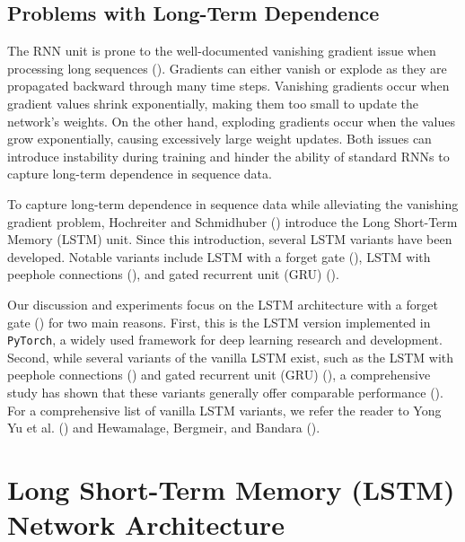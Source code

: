 \documentclass[
  letterpaper,
  double,
  12pt,
  1.0in]{beavtex}
\begin{document}
\subsection{Problems with Long-Term
Dependence}\label{problems-with-long-term-dependence}

The RNN unit is prone to the well-documented vanishing gradient issue
when processing long sequences
().
Gradients can either vanish or explode as they are propagated backward
through many time steps. Vanishing gradients occur when gradient values
shrink exponentially, making them too small to update the network's
weights. On the other hand, exploding gradients occur when the values
grow exponentially, causing excessively large weight updates. Both
issues can introduce instability during training and hinder the ability
of standard RNNs to capture long-term dependence in sequence data.

To capture long-term dependence in sequence data while alleviating the
vanishing gradient problem, Hochreiter and Schmidhuber
() introduce the Long Short-Term
Memory (LSTM) unit. Since this introduction, several LSTM variants have
been developed. Notable variants include LSTM with a forget gate
(),
LSTM with peephole connections (), and gated recurrent unit (GRU)
().

Our discussion and experiments focus on the LSTM architecture with a
forget gate () for two main reasons. First, this is the LSTM version
implemented in \texttt{PyTorch}, a widely used framework for deep
learning research and development. Second, while several variants of the
vanilla LSTM exist, such as the LSTM with peephole connections
() and gated
recurrent unit (GRU) (),
a comprehensive study has shown that these variants generally offer
comparable performance (). For a comprehensive list of vanilla LSTM variants, we refer the
reader to Yong Yu et al. () and
Hewamalage, Bergmeir, and Bandara
().

\section{Long Short-Term Memory (LSTM) Network
Architecture}\label{long-short-term-memory-lstm-network-architecture}
\end{document}
